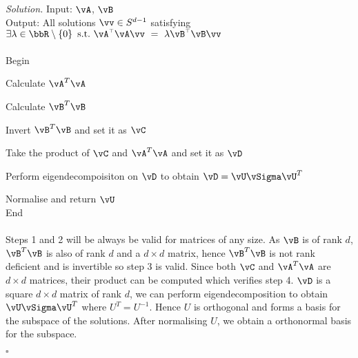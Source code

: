 \documentclass[11pt]{article}
\renewcommand\t{{\ensuremath{\scriptscriptstyle{\top}}}}
\newcommand{\unitsphere}[1][d-1]{\ensuremath{S^{#1}}} %
\theoremstyle{definition}
\newenvironment{solution}{\noindent\emph{Solution.}}{\hfill$\square$}
\begin{document}
\begin{solution}
\newline
Input: $\vA$, $\vB$
\\
Output: All solutions $\vv \in \unitsphere$ satisfying $\exists \lambda \in \bbR \setminus \cbr{0} \ \text{s.t.} \ \vA^\t\vA \vv \ = \ \lambda \vB^\t \vB \vv$
\\ \\
Begin

Calculate $\vA^T \vA$

Calculate $\vB^T \vB$

Invert $\vB^T \vB$ and set it as $\vC$

Take the product of $\vC$ and $\vA^T \vA$ and set it as $\vD$

Perform eigendecompoisiton on $\vD$ to obtain $\vD = \vU \vSigma \vU^T$

Normalise and return $\vU$
\\
End
\\ \\
Steps 1 and 2 will be always be valid for matrices of any size. As $\vB$ is of rank $d$, $\vB^T \vB$ is also of rank $d$ and a $d \times d$ matrix, hence $\vB^T \vB$ is not rank deficient and is invertible so step 3 is valid. Since both $\vC$ and $\vA^T \vA$ are $d \times d$ matrices, their product can be computed which verifies step 4. $\vD$ is a square $d \times d$ matrix of rank $d$, we can perform eigendecomposition to obtain $\vU \vSigma \vU^T$ where $U^T = U^{-1}$. Hence $U$ is orthogonal and forms a basis for the subspace of the solutions. After normalising $U$, we obtain a orthonormal basis for the subspace.

\end{solution}

\newpage

\end{document}
